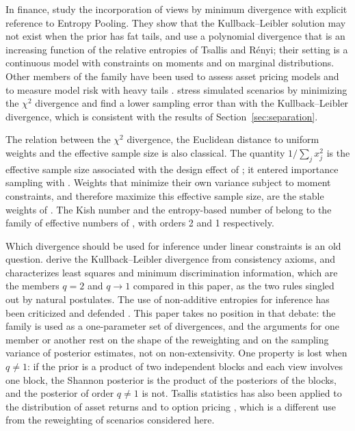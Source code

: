 \documentclass[11pt]{article}
\begin{document}
In finance, \citet{DeyJuneja2012} study the incorporation of views by
minimum divergence with explicit reference to Entropy Pooling. They show
that the Kullback--Leibler solution may not exist when the prior has fat
tails, and use a polynomial divergence that is an increasing function
of the relative entropies of Tsallis and R\'enyi; their setting is a
continuous model with constraints on moments and on marginal
distributions. Other members of the family have been used to assess asset
pricing models \citep{AlmeidaGarcia2012} and to measure model risk with
heavy tails \citep{GlassermanXu2014}.
\citet{MakamMillossovichTsanakas2021} stress simulated scenarios by
minimizing the $\chi^2$ divergence and find a lower sampling error than
with the Kullback--Leibler divergence, which is consistent with the
results of Section~\ref{sec:separation}.

The relation between the $\chi^2$ divergence, the Euclidean distance to
uniform weights and the effective sample size is also classical. The
quantity $1/\sum_j x_j^2$ is the effective sample size associated with the
design effect of \citet{Kish1965}; it entered importance sampling with
\citet{KongLiuWong1994}. Weights that minimize their own variance subject
to moment constraints, and therefore maximize this effective sample size,
are the stable weights of \citet{Zubizarreta2015}. The Kish number and the
entropy-based number of \citet{Meucci2012} belong to the family of
effective numbers of \citet{Hill1973}, with orders 2 and 1 respectively.

Which divergence should be used for inference under linear constraints is
an old question. \citet{ShoreJohnson1980} derive the Kullback--Leibler
divergence from consistency axioms, and \citet{Csiszar1991} characterizes
least squares and minimum discrimination information, which are the
members $q=2$ and $q \to 1$ compared in this paper, as the two rules
singled out by natural postulates. The use of non-additive entropies for
inference has been criticized \citep{PresseEtAl2013} and defended
\citep{Tsallis2015,JizbaKorbel2019}. This paper takes no position in that
debate: the family is used as a one-parameter set of divergences, and the
arguments for one member or another rest on the shape of the reweighting
and on the sampling variance of posterior estimates, not on
non-extensivity. One property is lost when $q \ne 1$: if the prior is a
product of two independent blocks and each view involves one block, the
Shannon posterior is the product of the posteriors of the blocks, and the
posterior of order $q \ne 1$ is not. Tsallis statistics has also been applied to the
distribution of asset returns and to option pricing
\citep{Borland2002,TsallisEtAl2003}, which is a different use from the
reweighting of scenarios considered here.
\end{document}
